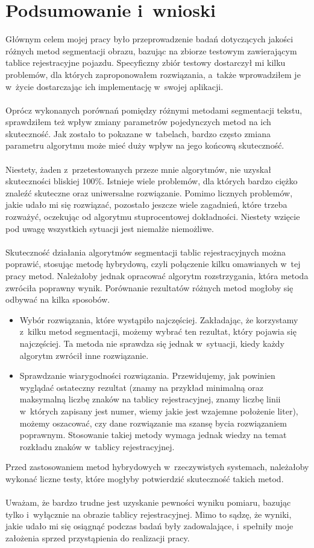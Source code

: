 \section{Podsumowanie i~wnioski}
Głównym celem mojej pracy było przeprowadzenie badań dotyczących jakości różnych metod segmentacji obrazu, bazując na zbiorze testowym zawierającym tablice rejestracyjne pojazdu. Specyficzny zbiór testowy dostarczył mi kilku problemów, dla których zaproponowałem rozwiązania, a~także wprowadziłem je w~życie dostarczając ich implementację w~swojej aplikacji.
\paragraph{}
Oprócz wykonanych porównań pomiędzy różnymi metodami segmentacji tekstu, sprawdziłem też wpływ zmiany parametrów pojedynczych metod na ich skuteczność. Jak zostało to pokazane w~tabelach, bardzo często zmiana parametru algorytmu może mieć duży wpływ na jego końcową skuteczność.
\paragraph{}
Niestety, żaden z~przetestowanych przeze mnie algorytmów, nie uzyskał skuteczności bliskiej 100\%. Istnieje wiele problemów, dla których bardzo ciężko znaleźć skuteczne oraz uniwersalne rozwiązanie. Pomimo licznych problemów, jakie udało mi się rozwiązać, pozostało jeszcze wiele zagadnień, które trzeba rozważyć, oczekując od algorytmu stuprocentowej dokładności. Niestety wzięcie pod uwagę wszystkich sytuacji jest niemalże niemożliwe.
\paragraph{}
Skuteczność działania algorytmów segmentacji tablic rejestracyjnych można poprawić, stosując metodę hybrydową, czyli połączenie kilku omawianych w~tej pracy metod. Należałoby jednak opracować algorytm rozstrzygania, która metoda zwróciła poprawny wynik. Porównanie rezultatów różnych metod mogłoby się odbywać na kilka sposobów.
\begin{itemize}
  \item Wybór rozwiązania, które wystąpiło najczęściej. Zakładając, że korzystamy z~kilku metod segmentacji, możemy wybrać ten rezultat, który pojawia się najczęściej. Ta metoda nie sprawdza się jednak w~sytuacji, kiedy każdy algorytm zwrócił inne rozwiązanie.
    \item Sprawdzanie wiarygodności rozwiązania. Przewidujemy, jak powinien wyglądać ostateczny rezultat (znamy na przykład minimalną oraz maksymalną liczbę znaków na tablicy rejestracyjnej, znamy liczbę linii w~których zapisany jest numer, wiemy jakie jest wzajemne położenie liter), możemy oszacować, czy dane rozwiązanie ma szansę bycia rozwiązaniem poprawnym. Stosowanie takiej metody wymaga jednak wiedzy na temat rozkładu znaków w~tablicy rejestracyjnej.
\end{itemize}
Przed zastosowaniem metod hybrydowych w~rzeczywistych systemach, należałoby wykonać liczne testy, które mogłyby potwierdzić skuteczność takich metod.
\paragraph{}
Uważam, że bardzo trudne jest uzyskanie pewności wyniku pomiaru, bazując tylko i~wyłącznie na obrazie tablicy rejestracyjnej. Mimo to sądzę, że wyniki, jakie udało mi się osiągnąć podczas badań były zadowalające, i~spełniły moje założenia sprzed przystąpienia do realizacji pracy.
